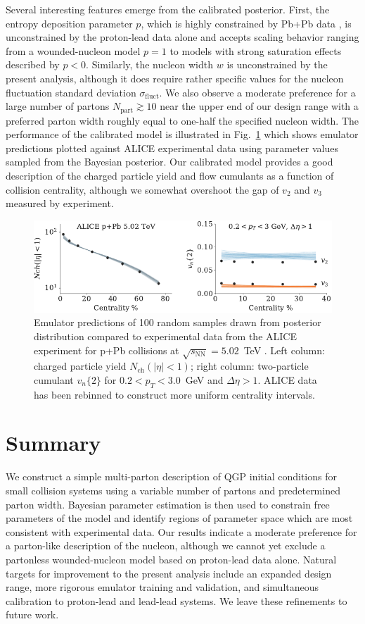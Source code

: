 \documentclass[3p,times,procedia]{elsarticle}
\begin{document}
Several interesting features emerge from the calibrated posterior.
First, the entropy deposition parameter $p$, which is highly constrained by Pb+Pb data \cite{Bernhard:2016tnd}, is unconstrained by the proton-lead data alone and accepts scaling behavior ranging from a wounded-nucleon model $p=1$ to models with strong saturation effects described by $p < 0$.
Similarly, the nucleon width $w$ is unconstrained by the present analysis, although it does require rather specific values for the nucleon fluctuation standard deviation $\sigma_\mathrm{fluct}$.
We also observe a moderate preference for a large number of partons $N_\mathrm{part} \gtrsim 10$ near the upper end of our design range with a preferred parton width roughly equal to one-half the specified nucleon width.
The performance of the calibrated model is illustrated in Fig.~\ref{fig:observables} which shows emulator predictions plotted against ALICE experimental data \cite{Abelev:2014mda} using parameter values sampled from the Bayesian posterior.
Our calibrated model provides a good description of the charged particle yield and flow cumulants as a function of collision centrality, although we somewhat overshoot the gap of $v_2$ and $v_3$ measured by experiment.
\begin{figure}
  \centering
  \includegraphics{observables_samples}
  \caption{
    \label{fig:observables} Emulator predictions of 100 random samples drawn from posterior distribution compared to experimental data from the ALICE experiment for p+Pb collisions at $\sqrt{s_\mathrm{NN}} = 5.02$~TeV \cite{Abelev:2014mda}.
    Left column: charged particle yield $N_\mathrm{ch}(|\eta| < 1)$; right column: two-particle cumulant $v_n\{2\}$ for $0.2 < p_T < 3.0$~GeV and $\Delta \eta > 1$. ALICE data has been rebinned to construct more uniform centrality intervals.
  }
\end{figure}

\section{Summary}
We construct a simple multi-parton description of QGP initial conditions for small collision systems using a variable number of partons and predetermined parton width.
Bayesian parameter estimation is then used to constrain free parameters of the model and identify regions of parameter space which are most consistent with experimental data.
Our results indicate a moderate preference for a parton-like description of the nucleon, although we cannot yet exclude a partonless wounded-nucleon model based on proton-lead data alone.
Natural targets for improvement to the present analysis include an expanded design range, more rigorous emulator training and validation, and simultaneous calibration to proton-lead and lead-lead systems.
We leave these refinements to future work.
\end{document}
